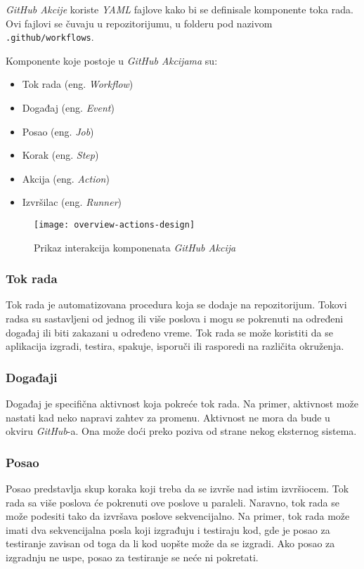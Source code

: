 \textit{GitHub Akcije} koriste \textit{YAML} fajlove kako bi se definisale komponente toka rada. Ovi fajlovi 
se čuvaju u repozitorijumu, u folderu pod nazivom \mbox{\texttt{.github/workflows}}.

Komponente koje postoje u \textit{GitHub Akcijama} su: 

\begin{itemize}
    \item Tok rada (eng. \textit{Workflow})
    \item Događaj (eng. \textit{Event})
    \item Posao (eng. \textit{Job})
    \item Korak (eng. \textit{Step})
    \item Akcija (eng. \textit{Action})
    \item Izvršilac (eng. \textit{Runner})
\end{itemize}

\begin{figure}[h]
    \centering
    \texttt{[image: overview-actions-design]}
    \caption{Prikaz interakcija komponenata \textit{GitHub Akcija}}
\end{figure}

\subsubsection{Tok rada}
Tok rada je automatizovana procedura koja se dodaje na repozitorijum. Tokovi radsa su sastavljeni 
od jednog ili više poslova i mogu se pokrenuti na određeni događaj ili biti zakazani u određeno vreme. 
Tok rada se može koristiti da se aplikacija izgradi, testira, spakuje, isporuči ili rasporedi na 
različita okruženja.

\subsubsection{Događaji}
Događaj je specifična aktivnost koja pokreće tok rada. Na primer, aktivnost može nastati kad neko napravi 
zahtev za promenu. Aktivnost ne mora da bude u okviru \textit{GitHub}-a. Ona može doći preko poziva od strane 
nekog eksternog sistema.

\subsubsection{Posao}
Posao predstavlja skup koraka koji treba da se izvrše nad istim izvršiocem. Tok rada sa više poslova 
će pokrenuti ove poslove u paraleli. Naravno, tok rada se može podesiti tako da izvršava poslove 
sekvencijalno. Na primer, tok rada može imati dva sekvencijalna posla koji izgrađuju i testiraju kod, 
gde je posao za testiranje zavisan od toga da li kod uopšte može da se izgradi. Ako posao za izgradnju 
ne uspe, posao za testiranje se neće ni pokretati.

